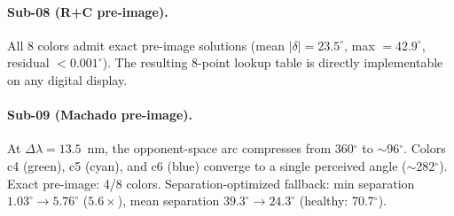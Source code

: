 \documentclass{article}
\begin{document}
\paragraph{Sub-08 (R+C pre-image).}
All 8 colors admit exact pre-image solutions (mean $|\delta| = 23.5^\circ$, max $= 42.9^\circ$, residual $< 0.001^\circ$).
The resulting 8-point lookup table is directly implementable on any digital display.

\paragraph{Sub-09 (Machado pre-image).}
At $\Delta\lambda = 13.5$~nm, the opponent-space arc compresses from 360$^\circ$ to $\sim$96$^\circ$.
Colors c4 (green), c5 (cyan), and c6 (blue) converge to a single perceived angle ($\sim$282$^\circ$).
Exact pre-image: 4/8 colors.
Separation-optimized fallback: min separation $1.03^\circ \to 5.76^\circ$ ($5.6\times$), mean separation $39.3^\circ \to 24.3^\circ$ (healthy: 70.7$^\circ$).
\end{document}
